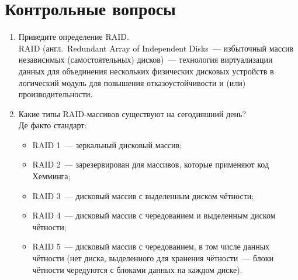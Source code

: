 \documentclass[12pt]{article}
\begin{document}
\section{Контрольные вопросы}
\begin{enumerate}
	\item Приведите определение RAID. \\
	      RAID (англ. Redundant Array of Independent Disks — избыточный массив независимых (самостоятельных) дисков) — технология виртуализации данных для объединения нескольких физических дисковых устройств в логический модуль для повышения отказоустойчивости и (или) производительности.
	\item Какие типы RAID-массивов существуют на сегодняшний день? \\
	      Де факто стандарт:
	      \begin{itemize}
		      \item RAID 1 — зеркальный дисковый массив;
		      \item RAID 2 — зарезервирован для массивов, которые применяют код Хемминга;
		      \item RAID 3 — дисковый массив с выделенным диском чётности;
		      \item RAID 4 — дисковый массив с чередованием и выделенным диском чётности;
		      \item RAID 5 — дисковый массив с чередованием, в том числе данных чётности (нет диска, выделенного для хранения чётности — блоки чётности чередуются с блоками данных на каждом диске).


\end{itemize}
\end{enumerate}
\end{document}

